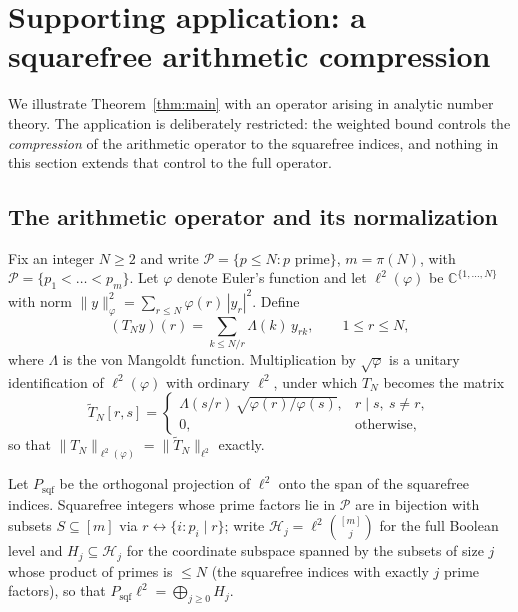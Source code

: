 \documentclass[11pt]{article}
\theoremstyle{remark}
\begin{document}
\appendix
\section{Supporting application: a squarefree arithmetic compression}\label{sec:arithmetic}

We illustrate Theorem~\ref{thm:main} with an operator arising in analytic
number theory. The application is deliberately restricted: the weighted
bound controls the \emph{compression} of the arithmetic operator to the
squarefree indices, and nothing in this section extends that control to
the full operator.

\subsection{The arithmetic operator and its normalization}
Fix an integer $N\ge 2$ and write $\mathcal P=\{p\le N: p \text{ prime}\}$,
$m=\pi(N)$, with $\mathcal P=\{p_1<\dots<p_m\}$. Let $\varphi$ denote
Euler's function and let $\ell^2(\varphi)$ be $\mathbb C^{\{1,\dots,N\}}$
with norm $\|y\|_\varphi^2=\sum_{r\le N}\varphi(r)\,|y_r|^2$. Define
\begin{equation}\label{eq:TN}
(T_N y)(r)=\sum_{k\le N/r}\Lambda(k)\,y_{rk},\qquad 1\le r\le N,
\end{equation}
where $\Lambda$ is the von Mangoldt function. Multiplication by
$\sqrt\varphi$ is a unitary identification of $\ell^2(\varphi)$ with
ordinary $\ell^2$, under which $T_N$ becomes the matrix
\begin{equation}\label{eq:conj}
\widetilde T_N[r,s]=
\begin{cases}
\Lambda(s/r)\,\sqrt{\varphi(r)/\varphi(s)}, & r\mid s,\ s\ne r,\\[2pt]
0,&\text{otherwise},
\end{cases}
\end{equation}
so that $\|T_N\|_{\ell^2(\varphi)}=\|\widetilde T_N\|_{\ell^2}$ exactly.

Let $P_{\mathrm{sqf}}$ be the orthogonal projection of $\ell^2$ onto the
span of the squarefree indices. Squarefree integers whose prime factors
lie in $\mathcal P$ are in bijection with subsets $S\subseteq[m]$ via
$r\leftrightarrow\{i: p_i\mid r\}$; write $\mathcal H_j=\ell^2\binom{[m]}{j}$ for the full
Boolean level and $H_j\subseteq\mathcal H_j$ for the coordinate subspace
spanned by the subsets of size $j$ whose product of primes is $\le N$ (the
squarefree indices with exactly $j$ prime factors), so that
$P_{\mathrm{sqf}}\ell^2=\bigoplus_{j\ge 0}H_j$.
\end{document}
